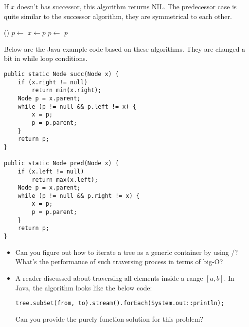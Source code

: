 \documentclass{article}
\begin{document}
If $x$ doesn't has successor, this algorithm returns NIL.
The predecessor case is quite similar to the successor algorithm, they
are symmetrical to each other.

\begin{algorithmic}[1]
    \State \Return {}()
  \Else
    \State $p \gets $ 
      \State $x \gets p$
      \State $p \gets $ 
    \EndWhile
    \State \Return $p$
  \EndIf
\EndFunction
\end{algorithmic}

Below are the Java example code based on these algorithms. They are changed
a bit in while loop conditions.

\lstset{language=Java}
\begin{lstlisting}
public static Node succ(Node x) {
    if (x.right != null)
        return min(x.right);
    Node p = x.parent;
    while (p != null && p.left != x) {
        x = p;
        p = p.parent;
    }
    return p;
}

public static Node pred(Node x) {
    if (x.left != null)
        return max(x.left);
    Node p = x.parent;
    while (p != null && p.right != x) {
        x = p;
        p = p.parent;
    }
    return p;
}
\end{lstlisting}

\begin{Exercise}

\begin{itemize}
\item Can you figure out how to iterate a tree as a generic container
by using /? What's the performance of such traversing
process in terms of big-O?

\item A reader discussed about traversing all elements inside a
range $[a, b]$. In Java, the algorithm looks like the below code:

\texttt{tree.subSet(from, to).stream().forEach(System.out::println);}

Can you provide the purely function solution for this problem?
\end{itemize}

\end{Exercise}

\end{document}
